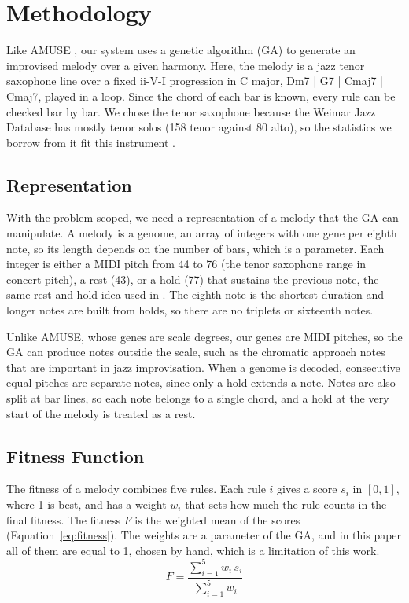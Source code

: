 \section{Methodology}\label{sec:methodology}

Like AMUSE \cite{ozcan2008}, our system uses a genetic algorithm (GA) to generate an improvised melody over a given harmony. Here, the melody is a jazz tenor saxophone line over a fixed ii-V-I progression in C major, Dm7 | G7 | Cmaj7 | Cmaj7, played in a loop. Since the chord of each bar is known, every rule can be checked bar by bar. We chose the tenor saxophone because the Weimar Jazz Database has mostly tenor solos (158 tenor against 80 alto), so the statistics we borrow from it fit this instrument \cite{pfleiderer2017}.

\subsection{Representation}

With the problem scoped, we need a representation of a melody that the GA can manipulate. A melody is a genome, an array of integers with one gene per eighth note, so its length depends on the number of bars, which is a parameter. Each integer is either a MIDI pitch from 44 to 76 (the tenor saxophone range in concert pitch), a rest (43), or a hold (77) that sustains the previous note, the same rest and hold idea used in \cite{ozcan2008, matic2010}. The eighth note is the shortest duration and longer notes are built from holds, so there are no triplets or sixteenth notes.

Unlike AMUSE, whose genes are scale degrees, our genes are MIDI pitches, so the GA can produce notes outside the scale, such as the chromatic approach notes that are important in jazz improvisation. When a genome is decoded, consecutive equal pitches are separate notes, since only a hold extends a note. Notes are also split at bar lines, so each note belongs to a single chord, and a hold at the very start of the melody is treated as a rest.

\subsection{Fitness Function}

The fitness of a melody combines five rules. Each rule $i$ gives a score $s_i$ in $[0, 1]$, where 1 is best, and has a weight $w_i$ that sets how much the rule counts in the final fitness. The fitness $F$ is the weighted mean of the scores (Equation~\ref{eq:fitness}). The weights are a parameter of the GA, and in this paper all of them are equal to 1, chosen by hand, which is a limitation of this work.
\begin{equation}\label{eq:fitness}
  F = \frac{\sum_{i=1}^{5} w_i\, s_i}{\sum_{i=1}^{5} w_i}
\end{equation}

